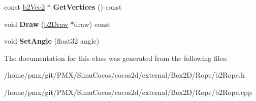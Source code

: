 \begin{DoxyCompactItemize}
\item 
\mbox{\label{classb2Rope_acf2b433c741b90b3668ff4477b4a8319}} 
const \hyperlink{structb2Vec2}{b2\+Vec2} $\ast$ {\bfseries Get\+Vertices} () const
\item 
\mbox{\label{classb2Rope_a9545f16b4ed203890a290d58ba56255c}} 
void {\bfseries Draw} (\hyperlink{classb2Draw}{b2\+Draw} $\ast$draw) const
\item 
\mbox{\label{classb2Rope_a8a1717a5e0b2c54d56fe438c8cae43b7}} 
void {\bfseries Set\+Angle} (float32 angle)
\end{DoxyCompactItemize}


The documentation for this class was generated from the following files\+:\begin{DoxyCompactItemize}
\item 
/home/pmx/git/\+P\+M\+X/\+Simu\+Cocos/cocos2d/external/\+Box2\+D/\+Rope/b2\+Rope.\+h\item 
/home/pmx/git/\+P\+M\+X/\+Simu\+Cocos/cocos2d/external/\+Box2\+D/\+Rope/b2\+Rope.\+cpp\end{DoxyCompactItemize}
